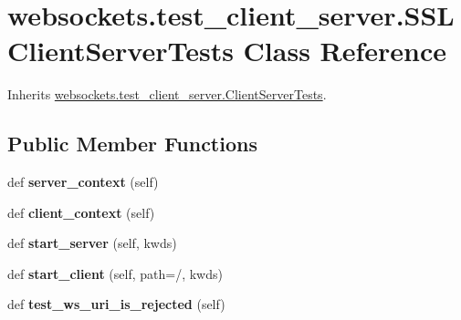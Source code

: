 \hypertarget{classwebsockets_1_1test__client__server_1_1_s_s_l_client_server_tests}{}\section{websockets.\+test\+\_\+client\+\_\+server.\+S\+S\+L\+Client\+Server\+Tests Class Reference}
\label{classwebsockets_1_1test__client__server_1_1_s_s_l_client_server_tests}


Inherits \hyperlink{classwebsockets_1_1test__client__server_1_1_client_server_tests}{websockets.\+test\+\_\+client\+\_\+server.\+Client\+Server\+Tests}.

\subsection*{Public Member Functions}
\begin{DoxyCompactItemize}
\item 
\mbox{\label{classwebsockets_1_1test__client__server_1_1_s_s_l_client_server_tests_af9202a2b4bb494e929fdcf77923368b5}} 
def {\bfseries server\+\_\+context} (self)
\item 
\mbox{\label{classwebsockets_1_1test__client__server_1_1_s_s_l_client_server_tests_aa7f14408552333a4934b96b0d4e15162}} 
def {\bfseries client\+\_\+context} (self)
\item 
\mbox{\label{classwebsockets_1_1test__client__server_1_1_s_s_l_client_server_tests_a04b2054a19dc0f83a89bf93ed083dcda}} 
def {\bfseries start\+\_\+server} (self, kwds)
\item 
\mbox{\label{classwebsockets_1_1test__client__server_1_1_s_s_l_client_server_tests_adf939234d1435d58bcced19336a66064}} 
def {\bfseries start\+\_\+client} (self, path=\textquotesingle{}/\textquotesingle{}, kwds)
\item 
\mbox{\label{classwebsockets_1_1test__client__server_1_1_s_s_l_client_server_tests_ae0c76bf365dfca20c67a5de2482d34ce}} 
def {\bfseries test\+\_\+ws\+\_\+uri\+\_\+is\+\_\+rejected} (self)
\end{DoxyCompactItemize}
